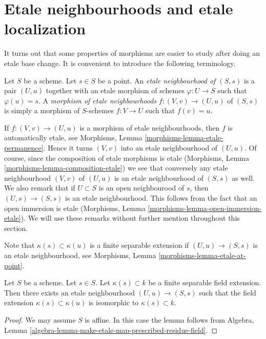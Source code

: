\section{Etale neighbourhoods and etale localization}
\label{section-etale-neighbourhoods}

\noindent
It turns out that some properties of morphisms are easier to study
after doing an etale base change. It is convenient to introduce the
following terminology.

\begin{definition}
\label{definition-etale-neighbourhood}
Let $S$ be a scheme. Let $s \in S$ be a point.
An {\it etale neighbourhood of $(S, s)$} is a
pair $(U, u)$ together with an etale morphism
of schemes $\varphi : U \to S$ such that $\varphi(u) = s$.
A {\it morphism of etale neighbourhoods} $f : (V, v) \to (U, u)$
of $(S, s)$ is simply a morphism of $S$-schemes $f : V \to U$ such
that $f(v) = u$.
\end{definition}

\noindent
If $f : (V, v) \to (U, u)$ is a morphism of etale
neighbourhoods, then $f$ is automatically etale, see
Morphisms, Lemma \ref{morphisms-lemma-etale-permanence}.
Hence it turns $(V, v)$ into an etale neighbourhood of
$(U, u)$. Of course, since the composition of etale morphisms
is etale (Morphisms, Lemma \ref{morphisms-lemma-composition-etale})
we see that conversely any etale neighbourhood $(V, v)$ of
$(U, u)$ is an etale neighbourhood of $(S, s)$ as well.
We also remark that if $U \subset S$ is an open neighbourood
of $s$, then $(U, s) \to (S, s)$ is an etale neighbourhood.
This follows from the fact that an open immersion is
etale (Morphisms, Lemma \ref{morphisms-lemma-open-immersion-etale}).
We will use these remarks without further mention throughout this
section.

\medskip\noindent
Note that $\kappa(s) \subset \kappa(u)$ is a finite separable extension
if $(U, u) \to (S, s)$ is an etale neighbourhood,
see Morphisms, Lemma \ref{morphisms-lemma-etale-at-point}.

\begin{lemma}
\label{lemma-realize-presecribed-residue-field-extension-etale}
Let $S$ be a scheme.
Let $s \in S$.
Let $\kappa(s) \subset k$ be a finite separable field extension.
Then there exists an etale neighbourhood $(U, u) \to (S, s)$
such that the field extension $\kappa(s) \subset \kappa(u)$ is
isomorphic to $\kappa(s) \subset k$.
\end{lemma}

\begin{proof}
We may assume $S$ is affine.
In this case the lemma follows from
Algebra, Lemma \ref{algebra-lemma-make-etale-map-prescribed-residue-field}.
\end{proof}

